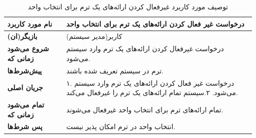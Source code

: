 \begin{table}
\begin{center}
\begin{tabular}{|p{5cm}|p{10cm}|}
	\hline
	\textbf{نام مورد کاربرد} &
درخواست غیر فعال کردن ارائه‌های یک ترم برای انتخاب واحد\\
	\hline
	\textbf{بازیگر(ان)} &
کاربر(مدیر سیستم)\\
	\hline
	\textbf{شروع می‌شود زمانی که} &
درخواست غیرفعال کردن ارائه‌های یک ترم وارد سیستم می‌شود.\\
	\hline
	\textbf{پیش‌شرط‌ها} &
 ترم در سیستم تعریف شده باشند.\\
	\hline
	\textbf{جریان اصلی} &
۱. درخواست غیر فعال کردن ارائه‌های یک ترم وارد سیستم می‌شود.\newline
۲.سیستم تمام ارائه‌های یک ترم را غیرفعال می‌کند.\\
	\hline
	\textbf{تمام می‌شود زمانی که} &
تمام ارائه‌های ترم برای انتخاب واحد غیرفعال می‌شوند.\\
	\hline
	\textbf{پس شرط‌ها} &
انتخاب واحد در ترم امکان پذیر نیست.\\
	\hline
\end{tabular}
\caption{\label{table:uc_disableofferings} توصیف مورد کاربرد غیرفعال کردن ارائه‌های یک ترم برای انتخاب واحد}
\end{center}
\end{table}


